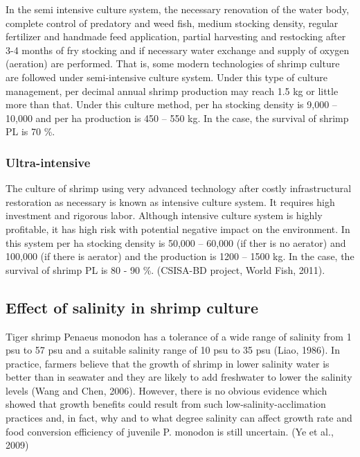 \documentclass[
]{book}
\begin{document}
In the semi intensive culture system, the necessary renovation of the
water body, complete control of predatory and weed fish, medium stocking
density, regular fertilizer and handmade feed application, partial
harvesting and restocking after 3-4 months of fry stocking and if
necessary water exchange and supply of oxygen (aeration) are performed.
That is, some modern technologies of shrimp culture are followed under
semi-intensive culture system. Under this type of culture management,
per decimal annual shrimp production may reach 1.5 kg or little more
than that. Under this culture method, per ha stocking density is 9,000
-- 10,000 and per ha production is 450 -- 550 kg. In the case, the
survival of shrimp PL is 70 \%.

\hypertarget{ultra-intensive}{%
\subsubsection{Ultra-intensive}\label{ultra-intensive}}

The culture of shrimp using very advanced technology after costly
infrastructural restoration as necessary is known as intensive culture
system. It requires high investment and rigorous labor. Although
intensive culture system is highly profitable, it has high risk with
potential negative impact on the environment. In this system per ha
stocking density is 50,000 -- 60,000 (if ther is no aerator) and 100,000
(if there is aerator) and the production is 1200 -- 1500 kg. In the
case, the survival of shrimp PL is 80 - 90 \%. (CSISA-BD project, World
Fish, 2011).

\hypertarget{effect-of-salinity-in-shrimp-culture}{%
\subsection{Effect of salinity in shrimp culture}\label{effect-of-salinity-in-shrimp-culture}}

Tiger shrimp Penaeus monodon has a tolerance of a wide range of salinity
from 1 psu to 57 psu and a suitable salinity range of 10 psu to 35 psu
(Liao, 1986). In practice, farmers believe that the growth of shrimp in
lower salinity water is better than in seawater and they are likely to
add freshwater to lower the salinity levels (Wang and Chen, 2006).
However, there is no obvious evidence which showed that growth benefits
could result from such low-salinity-acclimation practices and, in fact,
why and to what degree salinity can affect growth rate and food
conversion efficiency of juvenile P. monodon is still uncertain. (Ye et
al., 2009)
\end{document}
